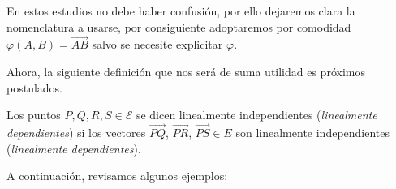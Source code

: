 \documentclass[11pt,a4paper,twoside]{book}\usepackage[]{graphicx}\usepackage[]{color}
\newcommand{\C}[1]{\mathcal{#1}}
\newcommand{\ora}[1]{\overrightarrow{#1}}
\begin{document}
En estos estudios no debe haber confusión, por ello dejaremos clara la nomenclatura a usarse, por consiguiente adoptaremos por comodidad $\varphi(A,B)=\ora{AB}$ salvo se necesite explicitar $\varphi$.\newline

Ahora, la siguiente definición que nos será de suma utilidad es próximos postulados.

\begin{definition}
Los puntos $P,Q,R,S\in \C{E}$ se dicen linealmente independientes (\emph{linealmente dependientes}) si los vectores $\ora{PQ}$, $\ora{PR}$, $\ora{PS}\in E$ son linealmente independientes (\emph{linealmente dependientes}).
\end{definition}

A continuación, revisamos algunos ejemplos:
\end{document}
